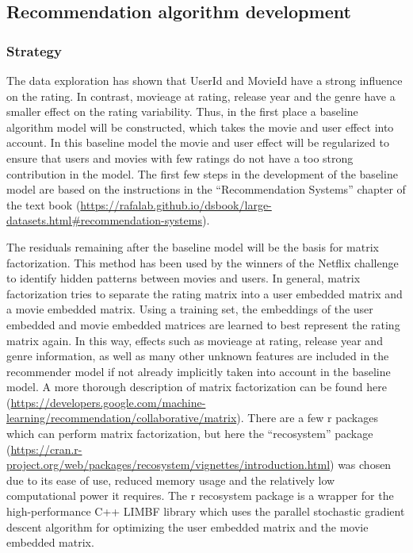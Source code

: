 \documentclass[
]{article}
\begin{document}
\hypertarget{recommendation-algorithm-development}{%
\subsection{Recommendation algorithm
development}\label{recommendation-algorithm-development}}

\hypertarget{strategy}{%
\subsubsection{Strategy}\label{strategy}}

The data exploration has shown that UserId and MovieId have a strong
influence on the rating. In contrast, movieage at rating, release year
and the genre have a smaller effect on the rating variability. Thus, in
the first place a baseline algorithm model will be constructed, which
takes the movie and user effect into account. In this baseline model the
movie and user effect will be regularized to ensure that users and
movies with few ratings do not have a too strong contribution in the
model. The first few steps in the development of the baseline model are
based on the instructions in the ``Recommendation Systems'' chapter of
the text book
(\url{https://rafalab.github.io/dsbook/large-datasets.html\#recommendation-systems}).

The residuals remaining after the baseline model will be the basis for
matrix factorization. This method has been used by the winners of the
Netflix challenge to identify hidden patterns between movies and users.
In general, matrix factorization tries to separate the rating matrix
into a user embedded matrix and a movie embedded matrix. Using a
training set, the embeddings of the user embedded and movie embedded
matrices are learned to best represent the rating matrix again. In this
way, effects such as movieage at rating, release year and genre
information, as well as many other unknown features are included in the
recommender model if not already implicitly taken into account in the
baseline model. A more thorough description of matrix factorization can
be found here
(\url{https://developers.google.com/machine-learning/recommendation/collaborative/matrix}).
There are a few r packages which can perform matrix factorization, but
here the ``recosystem'' package
(\url{https://cran.r-project.org/web/packages/recosystem/vignettes/introduction.html})
was chosen due to its ease of use, reduced memory usage and the
relatively low computational power it requires. The r recosystem package
is a wrapper for the high-performance C++ LIMBF library which uses the
parallel stochastic gradient descent algorithm for optimizing the user
embedded matrix and the movie embedded matrix.
\end{document}
